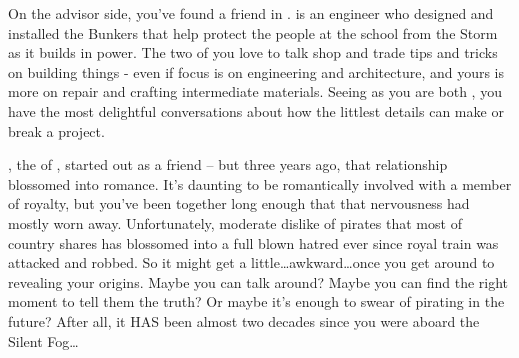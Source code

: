 \documentclass[char]{GL2020}
\begin{document}
On the advisor side, you’ve found a friend in \cBunker{}. \cBunker{} is an engineer who designed and installed the Bunkers that help protect the people at the school from the Storm as it builds in power. The two of you love to talk shop and trade tips and tricks on building things - even if \cBunker{\their} focus is on engineering and architecture, and yours is more on repair and crafting intermediate materials. Seeing as you are both \pShip{}, you have the most delightful conversations about how the littlest details can make or break a project. 

\cPrince{}, the \cPrince{\Heir} of \pFarm{}, started out as a friend -- but three years ago, that relationship blossomed into romance. It’s daunting to be romantically involved with a member of royalty, but you’ve been together long enough that that nervousness had mostly worn away. Unfortunately, \cPrince{\their} moderate dislike of pirates that most of \cPrince{\their} country shares has blossomed into a full blown hatred ever since \cPrince{\their} royal train was attacked and \cPrince{\they} \cPrince{\were} robbed. So it might get a little\ldots awkward\ldots once you get around to revealing your origins. Maybe you can talk \cPrince{\them} around? Maybe you can find the right moment to tell them the truth? Or maybe it’s enough to swear of pirating in the future? After all, it HAS been almost two decades since you were aboard the Silent Fog\ldots 
\end{document}
